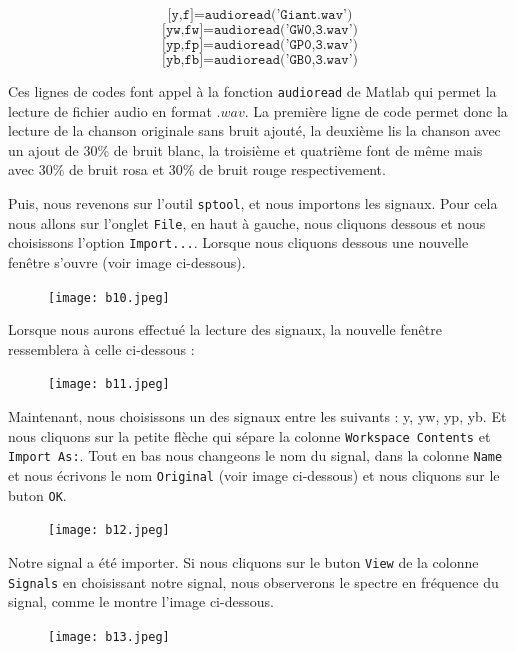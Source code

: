 \documentclass[conference,onecolumn]{IEEEtran}
\begin{document}
\[ \texttt{[y,f]=audioread('Giant.wav')}\]
\[ \texttt{[yw,fw]=audioread('GW0,3.wav')}\]
\[ \texttt{[yp,fp]=audioread('GP0,3.wav')}\]
\[ \texttt{[yb,fb]=audioread('GB0,3.wav')}\]

Ces lignes de codes font appel à la fonction \texttt{audioread} de Matlab qui permet la lecture de fichier audio en format $.wav$. La première ligne de code permet donc la lecture de la chanson originale sans bruit ajouté, la deuxième lis la chanson avec un ajout de 30\% de bruit blanc, la troisième et quatrième font de même mais avec 30\% de bruit rosa et 30\% de bruit rouge respectivement.

Puis, nous revenons sur l'outil \texttt{sptool}, et nous importons les signaux. Pour cela nous allons sur l'onglet \texttt{File}, en haut à gauche, nous cliquons dessous et nous choisissons l'option \texttt{Import...}. Lorsque nous cliquons dessous une nouvelle fenêtre s'ouvre (voir image ci-dessous).

 \begin{figure}[H]
 \centering
    \texttt{[image: b10.jpeg]}
\end{figure}



Lorsque nous aurons effectué la lecture des signaux, la nouvelle fenêtre ressemblera à celle ci-dessous :

 \begin{figure}[H]
 \centering
    \texttt{[image: b11.jpeg]}
\end{figure}


Maintenant, nous choisissons un des signaux entre les suivants : y, yw, yp, yb. Et nous cliquons sur la petite flèche qui sépare la colonne \texttt{Workspace Contents} et \texttt{Import As:}. Tout en bas nous changeons le nom du signal, dans la colonne \texttt{Name} et nous écrivons le nom \texttt{Original} (voir image ci-dessous) et nous cliquons sur le buton \texttt{OK}.

 \begin{figure}[H]
 \centering
    \texttt{[image: b12.jpeg]}
\end{figure}


Notre signal a été importer. Si nous cliquons sur le buton \texttt{View} de la colonne \texttt{Signals} en choisissant notre signal, nous observerons le spectre en fréquence du signal, comme le montre l'image ci-dessous.

 \begin{figure}[H]
 \centering
    \texttt{[image: b13.jpeg]}
\end{figure}
\end{document}
